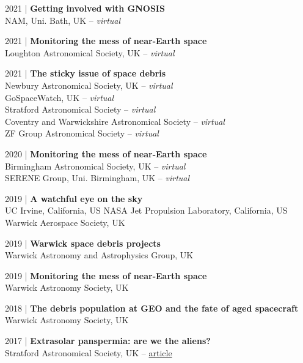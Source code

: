 \documentclass[10pt,a4paper]{altacv}
\begin{document}
\small 2021 | \textbf{Getting involved with GNOSIS} \\
NAM, Uni. Bath, UK -- \textit{virtual}

\smallskip

\small 2021 | \textbf{Monitoring the mess of near-Earth space} \\
Loughton Astronomical Society, UK -- \textit{virtual}

\smallskip

\small 2021 | \textbf{The sticky issue of space debris} \\
Newbury Astronomical Society, UK -- \textit{virtual} \\
GoSpaceWatch, UK -- \textit{virtual}\\
Stratford Astronomical Society -- \textit{virtual} \\
Coventry and Warwickshire Astronomical Society -- \textit{virtual} \\
ZF Group Astronomical Society -- \textit{virtual}

\smallskip

\small 2020 | \textbf{Monitoring the mess of near-Earth space} \\
Birmingham Astronomical Society, UK -- \textit{virtual} \\
SERENE Group, Uni. Birmingham, UK -- \textit{virtual}

\smallskip

\small 2019 | \textbf{A watchful eye on the sky} \\
UC Irvine, California, US \linebreak
NASA Jet Propulsion Laboratory, California, US \linebreak
Warwick Aerospace Society, UK 

\smallskip

\small 2019 | \textbf{Warwick space debris projects} \\
Warwick Astronomy and Astrophysics Group, UK

\smallskip

\small 2019 | \textbf{Monitoring the mess of near-Earth space} \\
Warwick Astronomy Society, UK

\smallskip

\small 2018 | \textbf{The debris population at GEO and the fate of aged spacecraft} \\
Warwick Astronomy Society, UK

\smallskip

\small 2017 | \textbf{Extrasolar panspermia: are we the aliens?} \\
Stratford Astronomical Society, UK -- \href{http://www.astro.org.uk/news/nov17/}{article}
\end{document}
